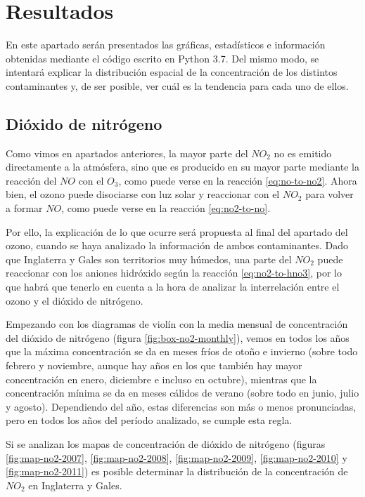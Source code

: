 \documentclass[12pt]{article}
\begin{document}
\newpage

\section{Resultados}

En este apartado serán presentados las gráficas, estadísticos e información obtenidas mediante el código escrito en Python 3.7. Del mismo modo, se intentará explicar la distribución espacial de la concentración de los distintos contaminantes y, de ser posible, ver cuál es la tendencia para cada uno de ellos.

\subsection{Dióxido de nitrógeno}

Como vimos en apartados anteriores, la mayor parte del $NO_{2}$ no es emitido directamente a la atmósfera, sino que es producido en su mayor parte mediante la reacción del $NO$ con el $O_{3}$, como puede verse en la reacción \ref{eq:no-to-no2}. Ahora bien, el ozono puede disociarse con luz solar y reaccionar con el $NO_{2}$ para volver a formar $NO$, como puede verse en la reacción \ref{eq:no2-to-no}.

Por ello, la explicación de lo que ocurre será propuesta al final del apartado del ozono, cuando se haya analizado la información de ambos contaminantes. Dado que Inglaterra y Gales son territorios muy húmedos, una parte del $NO_{2}$ puede reaccionar con los aniones hidróxido según la reacción \ref{eq:no2-to-hno3}, por lo que habrá que tenerlo en cuenta a la hora de analizar la interrelación entre el ozono y el dióxido de nitrógeno.

Empezando con los diagramas de violín con la media mensual de concentración del dióxido de nitrógeno (figura \ref{fig:box-no2-monthly}), vemos en todos los años que la máxima concentración se da en meses fríos de otoño e invierno (sobre todo febrero y noviembre, aunque hay años en los que también hay mayor concentración en enero, diciembre e incluso en octubre), mientras que la concentración mínima se da en meses cálidos de verano (sobre todo en junio, julio y agosto). Dependiendo del año, estas diferencias son más o menos pronunciadas, pero en todos los años del período analizado, se cumple esta regla.

Si se analizan los mapas de concentración de dióxido de nitrógeno (figuras \ref{fig:map-no2-2007}, \ref{fig:map-no2-2008}, \ref{fig:map-no2-2009}, \ref{fig:map-no2-2010} y \ref{fig:map-no2-2011}) es posible determinar la distribución de la concentración de $NO_{2}$ en Inglaterra y Gales.
\end{document}
